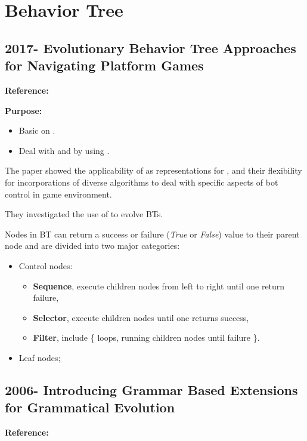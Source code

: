\section{Behavior Tree}

\crule

\subsection{2017- Evolutionary Behavior Tree Approaches for 
  Navigating Platform Games}

\textbf{Reference:} \cite{nicolau2016evolutionary}

\textbf{Purpose:}
\begin{itemize}
  \item Basic on .
  \item Deal with  and  
    by using .
\end{itemize}

The paper showed the applicability of  as 
representations for , 
and their flexibility for incorporations of diverse algorithms to 
deal with specific aspects of bot control in game environment.

They investigated the use of  to evolve BTs.

Nodes in BT can return a success or failure (\emph{True} or \emph{False}) value 
to their parent node and are divided into two major categories:
\begin{itemize}
  \item Control nodes:
    \begin{itemize}
      \item \textbf{Sequence}, execute children nodes from left to right until 
        one return failure,
      \item \textbf{Selector}, execute children nodes until one returns success,
      \item \textbf{Filter}, include \{ loops, running children nodes until 
        failure \}.
    \end{itemize}
  \item Leaf nodes;
\end{itemize}

\subsection{2006- Introducing Grammar Based Extensions for 
  Grammatical Evolution}

\textbf{Reference:} \cite{nicolau2006introducing}